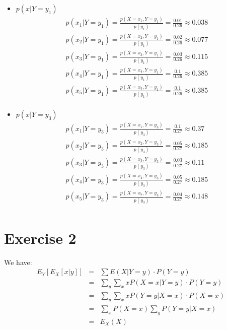 \documentclass{article}
\begin{document}
\begin{itemize}
    \item $p(x|Y=y_1)$
    \begin{align}
        p(x_1|Y=y_1) = \frac{p(X=x_1,Y=y_1)}{p(y_1)} = \frac{0.01}{0.26} \approx 0.038\\
        p(x_2|Y=y_1) = \frac{p(X=x_2,Y=y_1)}{p(y_1)} = \frac{0.02}{0.26} \approx 0.077\\
        p(x_3|Y=y_1) = \frac{p(X=x_3,Y=y_1)}{p(y_1)} = \frac{0.03}{0.26} \approx 0.115\\
        p(x_4|Y=y_1) = \frac{p(X=x_4,Y=y_1)}{p(y_1)} = \frac{0.1}{0.26} \approx 0.385\\
        p(x_5|Y=y_1) = \frac{p(X=x_5,Y=y_1)}{p(y_1)} = \frac{0.1}{0.26} \approx 0.385\\
    \end{align}
    \item $p(x|Y=y_3)$
    \begin{align}
        p(x_1|Y=y_3) = \frac{p(X=x_1,Y=y_3)}{p(y_3)} = \frac{0.1}{0.27} \approx 0.37\\
        p(x_2|Y=y_3) = \frac{p(X=x_2,Y=y_3)}{p(y_3)} = \frac{0.05}{0.27} \approx 0.185\\
        p(x_3|Y=y_3) = \frac{p(X=x_3,Y=y_3)}{p(y_3)} = \frac{0.03}{0.27} \approx 0.11\\
        p(x_4|Y=y_3) = \frac{p(X=x_4,Y=y_3)}{p(y_3)} = \frac{0.05}{0.27} \approx 0.185\\
        p(x_5|Y=y_3) = \frac{p(X=x_5,Y=y_3)}{p(y_3)} = \frac{0.04}{0.27} \approx 0.148\\
    \end{align}
\end{itemize}


\section{Exercise 2}
We have:
\begin{eqnarray*}
    E_Y[E_X[x|y]] & = & \sum E(X|Y=y) \cdot P(Y=y) \\
    & = & \sum_y \sum_x x P(X=x|Y=y) \cdot P(Y=y) \\
    & = & \sum_y \sum_x x P(Y=y|X=x) \cdot P(X=x) \\
    & = & \sum_x P(X=x) \sum_y P(Y=y|X=x) \\
    & = & E_X(X)
\end{eqnarray*}

\end{document}
